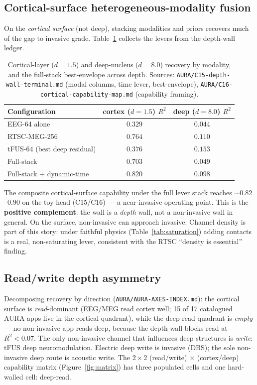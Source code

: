 \documentclass[11pt]{article}
\newcommand{\Rsq}{R^{2}}
\newcommand{\greenbox}[1]{\textcolor{green!45!black}{\textbf{#1}}}
\begin{document}
\subsection{Cortical-surface heterogeneous-modality fusion}
\label{sec:cortical}

On the \emph{cortical surface} (not deep), stacking modalities and priors recovers
much of the gap to invasive grade. Table~\ref{tab:cortical} collects the levers from
the depth-wall ledger.

\begin{table}[h]
\centering
\caption{Cortical-layer ($d\!=\!1.5$) and deep-nucleus ($d\!=\!8.0$) recovery by
modality, and the full-stack best-envelope across depth. Sources:
\texttt{AURA/C15-depth-wall-terminal.md} (modal columns, time lever, best-envelope),
\texttt{AURA/C16-cortical-capability-map.md} (capability framing).}
\label{tab:cortical}
\begin{tabular}{lcc}
\toprule
Configuration & cortex ($d\!=\!1.5$) $\Rsq$ & deep ($d\!=\!8.0$) $\Rsq$ \\
\midrule
EEG-64 alone                       & $0.329$ & $0.044$ \\
RTSC-MEG-256                       & $0.764$ & $0.110$ \\
tFUS-64 (best deep residual)       & $0.376$ & $\mathbf{0.153}$ \\
Full-stack                         & $0.703$ & $0.049$ \\
Full-stack $+$ dynamic-time        & $\mathbf{0.820}$ & $0.098$ \\
\bottomrule
\end{tabular}
\end{table}

The composite cortical-surface capability under the full lever stack reaches
$\sim 0.82$--$0.90$ on the toy head (C15/C16) --- a near-invasive operating point.
This is the \greenbox{positive complement}: the wall is a \emph{depth} wall, not a
non-invasive wall in general. On the surface, non-invasive can approach invasive.
Channel density is part of this story: under faithful physics (Table~\ref{tab:saturation})
adding contacts is a real, non-saturating lever, consistent with the RTSC ``density
is essential'' finding.

\subsection{Read/write depth asymmetry}
\label{sec:asymmetry}

Decomposing recovery by direction (\texttt{AURA/AURA-AXES-INDEX.md}): the cortical
surface is \emph{read}-dominant (EEG/MEG read cortex well; 15 of 17 catalogued AURA
apps live in the cortical quadrant), while the deep-read quadrant is \emph{empty} ---
no non-invasive app reads deep, because the depth wall blocks read at $\Rsq<0.07$.
The only non-invasive channel that influences deep structures is \emph{write}: tFUS
deep neuromodulation. Electric deep write is invasive (DBS); the sole non-invasive
deep route is acoustic write. The $2\times2$ (read/write) $\times$ (cortex/deep)
capability matrix (Figure~\ref{fig:matrix}) has three populated cells and one
hard-walled cell: deep-read.
\end{document}
